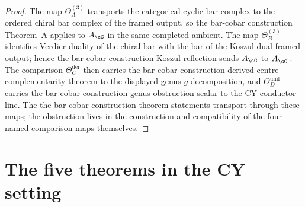 \begin{proof}
The map $\Theta_A^{(3)}$ transports the categorical cyclic bar complex to
the ordered chiral bar complex of the framed output, so the bar-cobar construction Theorem~A
applies to $A_\cC$ in the same completed ambient. The map
$\Theta_B^{(3)}$ identifies Verdier duality of the chiral bar with the bar
of the Koszul-dual framed output; hence the bar-cobar construction Koszul reflection sends
$A_\cC$ to $A_{\cC^!}$. The comparison
$\Theta_C^{\mathrm{der}}$ then carries the bar-cobar construction derived-centre
complementarity theorem to the displayed genus-$g$ decomposition, and
$\Theta_D^{\mathrm{unif}}$ carries the bar-cobar construction genus obstruction scalar
to the CY conductor line. The the bar-cobar construction theorem statements transport
through these maps; the obstruction lives in the construction and
compatibility of the four named comparison maps themselves.
\end{proof}



\section{The five theorems in the CY setting}
\label{sec:five-theorems-cy}

